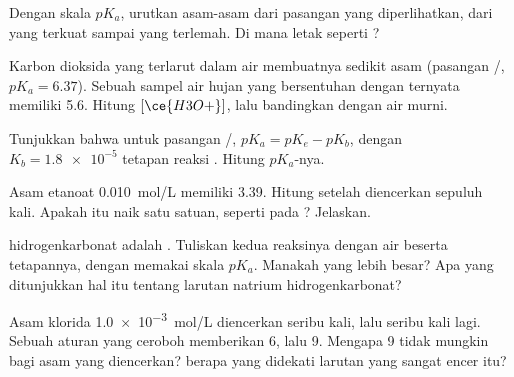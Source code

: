\begin{exercise}[$\star\star$]\label{exo:g12:ka-and-pka:9}
Dengan skala $pK_a$, urutkan asam-asam dari pasangan yang diperlihatkan,
dari yang terkuat sampai yang terlemah. Di mana letak  seperti
?
\end{exercise}

\begin{exercise}[$\star\star$]\label{exo:g12:ka-and-pka:10}
Karbon dioksida yang terlarut dalam air membuatnya sedikit asam
(pasangan /, $pK_a = 6.37$). Sebuah sampel air
hujan yang bersentuhan dengan  ternyata memiliki  5.6. Hitung
$[\ce{H3O+}]$, lalu bandingkan dengan air murni.
\end{exercise}

\begin{exercise}[$\star\star$]\label{exo:g12:ka-and-pka:11}
Tunjukkan bahwa untuk pasangan /, $pK_a = pK_e - pK_b$,
dengan $K_b = \num{1.8e-5}$ tetapan reaksi .
Hitung $pK_a$-nya.
\end{exercise}

\begin{exercise}[$\star\star\star$]\label{exo:g12:ka-and-pka:12}
Asam etanoat \qty{0.010}{mol/L} memiliki  3.39. Hitung  setelah
diencerkan sepuluh kali. Apakah  itu naik satu satuan, seperti pada
? Jelaskan.
\end{exercise}

\begin{exercise}[$\star\star\star$]\label{exo:g12:ka-and-pka:13}
 hidrogenkarbonat adalah . Tuliskan kedua reaksinya dengan
air beserta tetapannya, dengan memakai skala $pK_a$. Manakah yang lebih
besar? Apa yang ditunjukkan hal itu tentang  larutan natrium
hidrogenkarbonat?
\end{exercise}

\begin{exercise}[$\star\star\star$]\label{exo:g12:ka-and-pka:14}
Asam klorida \qty{1.0e-3}{mol/L} diencerkan seribu kali, lalu seribu
kali lagi. Sebuah aturan yang ceroboh memberikan  6, lalu  9.
Mengapa  9 tidak mungkin bagi asam yang diencerkan?  berapa yang
didekati larutan yang sangat encer itu?
\end{exercise}

